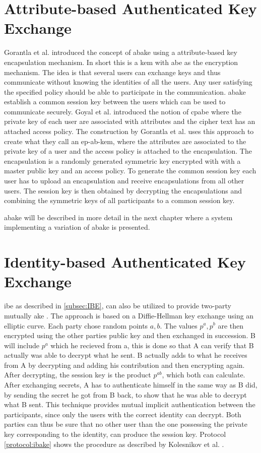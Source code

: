 \section{Attribute-based Authenticated Key Exchange}\label{sec:abake}
Gorantla et al. \cite{gorantla2010attribute} introduced the concept of \gls{abake} using a attribute-based key encapsulation mechanism. In short this is a \gls{kem} with \gls{abe} as the encryption mechanism. The idea is that several users can exchange keys and thus communicate without knowing the identities of all the users. Any user satisfying the specified policy should be able to participate in the communication. \gls{abake} establish a common session key between the users which can be used to communicate securely. Goyal et al. \cite{ABE} introduced the notion of \gls{cpabe} where the private key of each user are associated with attributes and the cipher text has an attached access policy. The construction by Gorantla et al. \cite{gorantla2010attribute} uses this approach to create what they call an \gls{ep-ab-kem}, where the attributes are associated to the private key of a user and the access policy is attached to the encapsulation. The encapsulation is a randomly generated symmetric key encrypted with with a master public key and an access policy. To generate the common session key each user has to upload an encapsulation and receive encapsulations from all other users. The session key is then obtained by decrypting the encapsulations and combining the symmetric keys of all participants to a common session key. 
\par \Gls{abake} will be described in more detail in the next chapter where a system implementing a variation of \gls{abake} is presented. 

\section{Identity-based Authenticated Key Exchange}
\Gls{ibe} as described in \ref{subsec:IBE}, can also be utilized to provide two-party mutually \gls{ake} \cite{ibake}. The approach is based on a Diffie-Hellman key exchange using an elliptic curve. Each party chose random points $a,b$. The values $p^a, p^b$ are then encrypted using the other parties public key and then exchanged in succession. B will include $p^a$ which he recieved from a, this is done so that A can verify that B actually was able to decrypt what he sent. B actually adds to what he receives from A by decrypting and adding his contribution and then encrypting again. After decrypting, the session key is the product $p^{ab}$, which both can calculate. After exchanging secrets, A has to authenticate himself in the same way as B did, by sending the secret he got from B back, to show that he was able to decrypt what B sent. This technique provides mutual implicit authentication between the participants, since only the users with the correct identity can decrypt. Both parties can thus be sure that no other user than the one possessing the private key corresponding to the identity, can produce the session key. Protocol \ref{protocol:ibake} shows the procedure as described by Kolesnikov et al. \cite{ibake}. 

